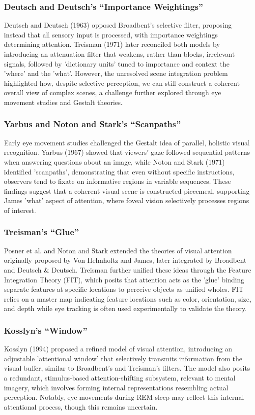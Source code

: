 \documentclass{article}
\begin{document}
\subsubsection{Deutsch and Deutsch's “Importance Weightings”}
Deutsch and Deutsch (1963) opposed Broadbent's selective filter, proposing instead that all sensory input is processed, with importance weightings determining attention.
Treisman (1971) later reconciled both models by introducing an attenuation filter that weakens, rather than blocks, irrelevant signals, followed by 'dictionary units' tuned to importance and context the 'where' and the 'what'. 
However, the unresolved scene integration problem highlighted how, despite selective perception, we can still construct a coherent overall view of complex scenes, a challenge further explored through eye movement studies and Gestalt theories.

\subsubsection{Yarbus and Noton and Stark's “Scanpaths”}
Early eye movement studies challenged the Gestalt idea of parallel, holistic visual recognition. 
Yarbus (1967) showed that viewers' gaze followed sequential patterns when answering questions about an image, while Noton and Stark (1971) identified 'scanpaths', demonstrating that even without specific instructions, observers tend to fixate on informative regions in variable sequences. 
These findings suggest that a coherent visual scene is constructed piecemeal, supporting James 'what' aspect of attention, where foveal vision selectively processes regions of interest.

\subsubsection{Treisman's “Glue”}
Posner et al. and Noton and Stark extended the theories of visual attention originally proposed by Von Helmholtz and James, later integrated by Broadbent and Deutsch \& Deutsch. 
Treisman further unified these ideas through the Feature Integration Theory (FIT), which posits that attention acts as the 'glue' binding separate features at specific locations to perceive objects as unified wholes. 
FIT relies on a master map indicating feature locations such as color, orientation, size, and depth while eye tracking is often used experimentally to validate the theory.

\subsubsection{Kosslyn's “Window”}
Kosslyn (1994) proposed a refined model of visual attention, introducing an adjustable 'attentional window' that selectively transmits information from the visual buffer, similar to Broadbent's and Treisman's filters. 
The model also posits a redundant, stimulus-based attention-shifting subsystem, relevant to mental imagery, which involves forming internal representations resembling actual perception. 
Notably, eye movements during REM sleep may reflect this internal attentional process, though this remains uncertain.
\end{document}
